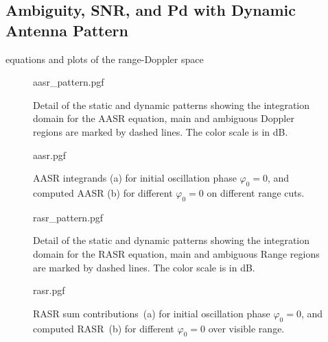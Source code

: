 \documentclass[11pt, a4paper]{scrartcl}
\begin{document}
    \subsection{Ambiguity, SNR, and Pd with Dynamic Antenna Pattern}
    \label{subsec:ambiguity_snr_pd_with_dynamic_antenna_pattern}
    equations and plots of the range-Doppler space
    \begin{figure}[!htb]
        {aasr_pattern.pgf}
        \caption{Detail of the static and dynamic patterns showing the integration domain for the AASR equation, main and ambiguous
        Doppler regions are marked by dashed lines. The color scale is in dB.
        }
        \label{fig:aasrpattern}
    \end{figure}
    \begin{figure}[!htb]
        {aasr.pgf}
        \caption{AASR integrands (a) for initial oscillation phase $\varphi_0=0$, and computed AASR (b) for different $\varphi_0=0$ on different range cuts.
        }
        \label{fig:aasr}
    \end{figure}
    \begin{figure}[!htb]
        {rasr_pattern.pgf}
        \caption{Detail of the static and dynamic patterns showing the integration domain for the RASR equation, main and ambiguous
        Range regions are marked by dashed lines. The color scale is in dB.
        }
        \label{fig:rasrpattern}
    \end{figure}
    \begin{figure}[!htb]
        {rasr.pgf}
        \caption{RASR sum contributions~(a) for initial oscillation phase $\varphi_0=0$, and computed RASR~(b) for different $\varphi_0=0$ over visible range.
        }
        \label{fig:rasr}
    \end{figure}
\end{document}
